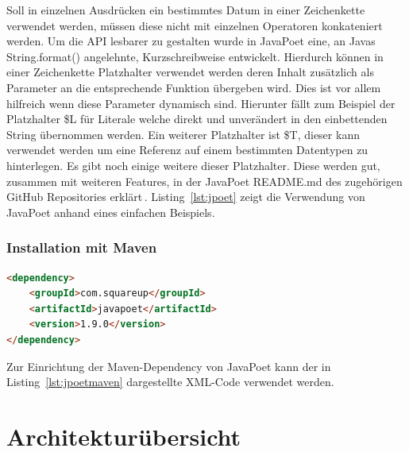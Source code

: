 \documentclass[12pt,oneside,a4paper,parskip]{scrbook}
\begin{document}
Soll in einzelnen Ausdrücken ein bestimmtes Datum in einer Zeichenkette verwendet werden, müssen diese nicht mit einzelnen Operatoren konkateniert werden. Um die API lesbarer zu gestalten wurde in JavaPoet eine, an Javas String.format() angelehnte, Kurzschreibweise entwickelt. Hierdurch können in einer Zeichenkette Platzhalter verwendet werden deren Inhalt zusätzlich als Parameter an die entsprechende Funktion übergeben wird. Dies ist vor allem hilfreich wenn diese Parameter dynamisch sind. Hierunter fällt zum Beispiel der Platzhalter \$L für Literale welche direkt und unverändert in den einbettenden String übernommen werden. Ein weiterer Platzhalter ist \$T, dieser kann verwendet werden um eine Referenz auf einem bestimmten Datentypen zu hinterlegen. Es gibt noch einige weitere dieser Platzhalter. Diese werden gut, zusammen mit weiteren Features, in der JavaPoet README.md des zugehörigen GitHub Repositories erklärt\,\cite{javapoet2017}. Listing~\ref{lst:jpoet} zeigt die Verwendung von JavaPoet anhand eines einfachen Beispiels.

\subsubsection{Installation mit Maven}

\begin{lstlisting}[label=lst:jpoetmaven,
language=HTML,
firstnumber=1,
caption=XML-Code zum Einbinden von JavaPoet als Maven-Dependency.]
<dependency>
	<groupId>com.squareup</groupId>
	<artifactId>javapoet</artifactId>
	<version>1.9.0</version>
</dependency>
\end{lstlisting}

Zur Einrichtung der Maven-Dependency von JavaPoet kann der in Listing~\ref{lst:jpoetmaven} dargestellte XML-Code verwendet werden. 

\section{Architekturübersicht}
\end{document}
